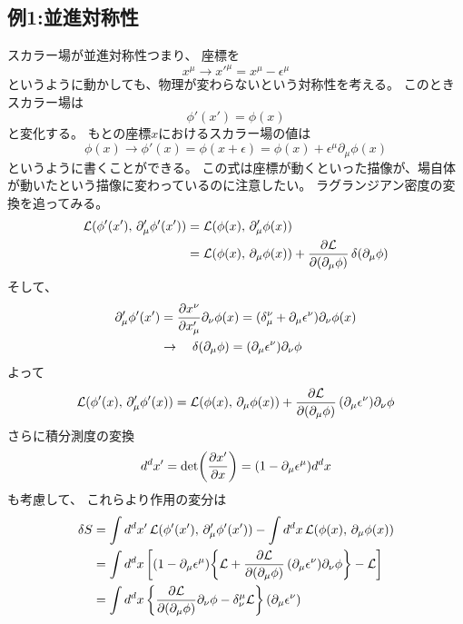 \documentclass[../../master.tex]{subfiles}
\begin{document}
\subsection*{例1:並進対称性}
スカラー場が並進対称性つまり、
座標を
\begin{equation}
    x^\mu \rightarrow {x'}^\mu = x^\mu - \epsilon^\mu
\end{equation}
というように動かしても、物理が変わらないという対称性を考える。
このときスカラー場は
\begin{equation*}
    \phi'(x')=\phi(x)
\end{equation*}
と変化する。
もとの座標\(x\)におけるスカラー場の値は
\begin{equation}
    \phi(x) \rightarrow \phi'(x) = \phi(x+\epsilon) = \phi(x) + \epsilon^\mu\partial_\mu \phi(x)
\end{equation}
というように書くことができる。
この式は座標が動くといった描像が、場自体が動いたという描像に変わっているのに注意したい。
ラグランジアン密度の変換を追ってみる。
\begin{align*}
    \mathcal{L}(\phi'(x'),\,\partial'_\mu \phi'(x'))
    &= \mathcal{L}(\phi(x),\,\partial'_\mu \phi(x)) \\
    &= \mathcal{L}(\phi(x),\,\partial_\mu \phi(x)) + \pdv{\mathcal{L}}{(\partial_\mu\phi)}\var{(\partial_\mu \phi)}
\end{align*}
そして、
\begin{align*}
    \partial'_\mu \phi'(x') &= \pdv{x^\nu}{x'_{\mu}}\partial_\nu\phi(x) = (\delta_\mu^\nu + \partial_\mu \epsilon^\nu)\partial_\nu\phi(x)\\
    &\rightarrow \quad \var{(\partial_\mu \phi)} =  (\partial_\mu \epsilon^\nu) \partial_\nu\phi
\end{align*}
よって
\begin{equation}
    \mathcal{L}(\phi'(x),\,\partial'_\mu \phi'(x))
    =\mathcal{L}(\phi(x),\,\partial_\mu \phi(x)) + \pdv{\mathcal{L}}{(\partial_\mu\phi)}\,(\partial_\mu \epsilon^\nu) \partial_\nu\phi
\end{equation}
さらに積分測度の変換
\begin{equation*}
    d^dx' = \det(\pdv{x'}{x})=\qty(1 -\partial_\mu \epsilon^\mu) d^dx
\end{equation*}
も考慮して、
これらより作用の変分は
\begin{align*}
    \var{S}
    &= \int d^dx'\, \mathcal{L}(\phi'(x'),\,\partial'_\mu \phi'(x')) - \int d^dx\, \mathcal{L}(\phi(x),\,\partial_\mu \phi(x))\\
    &= \int d^dx\, \qty[\qty(1 -\partial_\mu \epsilon^\mu)\qty{\mathcal{L} + \pdv{\mathcal{L}}{(\partial_\mu\phi)}\,(\partial_\mu \epsilon^\nu) \partial_\nu\phi}
    -\mathcal{L}]\\
    &= \int d^dx\, \qty{\pdv{\mathcal{L}}{(\partial_\mu\phi)}\partial_\nu\phi - \delta_\nu^\mu \mathcal{L}}(\partial_\mu \epsilon^\nu)
\end{align*}
\end{document}
